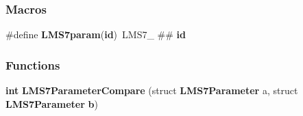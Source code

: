 \subsubsection*{Macros}
\begin{DoxyCompactItemize}
\item 
\#define {\bf L\+M\+S7param}({\bf id})~L\+M\+S7\+\_\+ \#\# {\bf id}
\end{DoxyCompactItemize}
\subsubsection*{Functions}
\begin{DoxyCompactItemize}
\item 
{\bf int} {\bf L\+M\+S7\+Parameter\+Compare} (struct {\bf L\+M\+S7\+Parameter} a, struct {\bf L\+M\+S7\+Parameter} {\bf b})
\end{DoxyCompactItemize}
